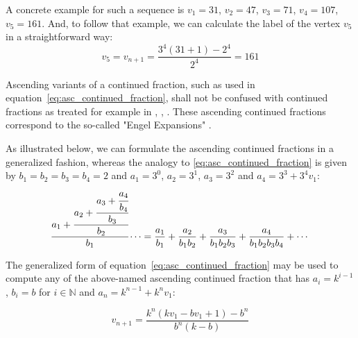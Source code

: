 \begin{example}
	A concrete example for such a sequence is $v_1=31$, $v_2=47$, $v_3=71$, $v_4=107$, $v_5=161$. And, to follow that example, we can calculate the label of the vertex $v_5$ in a straightforward way:
	\[
	v_5=v_{n+1}=\frac{3^4(31+1)-2^4}{2^4}=161
	\]
\end{example}

\begin{remark}
	Ascending variants of a continued fraction, such as used in equation~\ref{eq:asc_continued_fraction}, shall not be confused with continued fractions as treated for example in \cite{Ref_Moore}, \cite{Ref_Hensley}, \cite{Ref_Borwe_etal}. These ascending continued fractions correspond to the so-called "Engel Expansions" \cite{Ref_Kraaikamp_Wu}.
\end{remark}

\par\noindent
As illustrated below, we can formulate the ascending continued fractions in a generalized fashion, whereas the analogy to \ref{eq:asc_continued_fraction} is given by $b_1=b_2=b_3=b_4=2$ and $a_1=3^0$, $a_2=3^1$, $a_3=3^2$ and $a_4=3^3+3^4v_1$:
\[
\cfrac{a_1+\cfrac{a_2+\cfrac{a_3+\cfrac{a_4}{b_4}}{b_3}}{b_2}}{b_1}\dotsb=\frac{a_1}{b_1}+\frac{a_2}{b_1b_2}+\frac{a_3}{b_1b_2b_3}+\frac{a_4}{b_1b_2b_3b_4}+\cdots
\]

\par\medskip
The generalized form of equation~\ref{eq:asc_continued_fraction} may be used to compute any of the above-named ascending continued fraction that has $a_i=k^{i-1}$, $b_i=b$ for $i\in\mathbb{N}$ and $a_n=k^{n-1}+k^nv_1$:

\par\medskip
\begin{equation}
\label{eq:generalized_asc_continued_fraction}
v_{n+1}=\frac{k^n(kv_1-bv_1+1)-b^n}{b^n(k-b)}
\end{equation}
